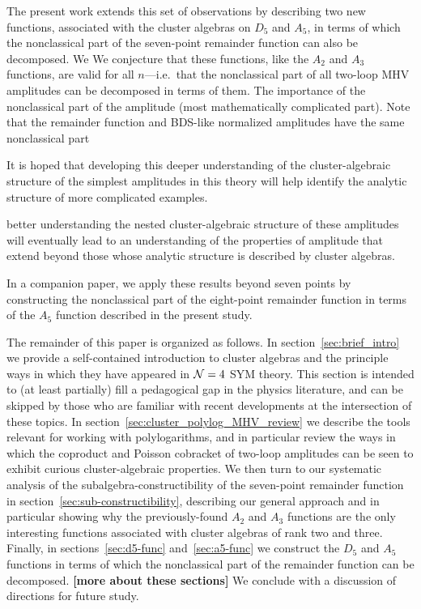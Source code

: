 \documentclass[11pt]{article}
\def\draftnote#1{{\bf [#1]}}
\begin{document}
The present work extends this set of observations by describing two new functions, associated with the cluster algebras on $D_5$ and $A_5$, in terms of which the nonclassical part of the seven-point remainder function can also be decomposed. We  We conjecture that these functions, like the $A_2$ and $A_3$ functions, are valid for all $n$---i.e.~that the nonclassical part of all two-loop MHV amplitudes can be decomposed in terms of them. The importance of the nonclassical part of the amplitude (most mathematically complicated part). Note that the remainder function and BDS-like normalized amplitudes have the same nonclassical part


It is hoped that developing this deeper understanding of the cluster-algebraic structure of the simplest amplitudes in this theory will help identify the analytic structure of more complicated examples.

better understanding the nested cluster-algebraic structure of these amplitudes will eventually lead to an understanding of the properties of amplitude that extend beyond those whose analytic structure is described by cluster algebras.

\vspace{3cm}
In a companion paper, we apply these results beyond seven points by constructing the nonclassical part of the eight-point remainder function in terms of the $A_5$ function described in the present study.   


The remainder of this paper is organized as follows. In section~\ref{sec:brief_intro} we provide a self-contained introduction to cluster algebras and the principle ways in which they have appeared in ${\cal N} =4$ SYM theory. This section is intended to (at least partially) fill a pedagogical gap in the physics literature, and can be skipped by those who are familiar with recent developments at the intersection of these topics. In section~\ref{sec:cluster_polylog_MHV_review} we describe the tools relevant for working with polylogarithms, and in particular review the ways in which the coproduct and Poisson cobracket of two-loop amplitudes can be seen to exhibit curious cluster-algebraic properties. We then turn to our systematic analysis of the subalgebra-constructibility of the seven-point remainder function in section~\ref{sec:sub-constructibility}, describing our general approach and in particular showing why the previously-found $A_2$ and $A_3$ functions are the only interesting functions associated with cluster algebras of rank two and three. Finally, in sections~\ref{sec:d5-func} and~\ref{sec:a5-func} we construct the $D_5$ and $A_5$ functions in terms of which the nonclassical part of the remainder function can be decomposed. \draftnote{more about these sections} We conclude with a discussion of directions for future study.
\end{document}
